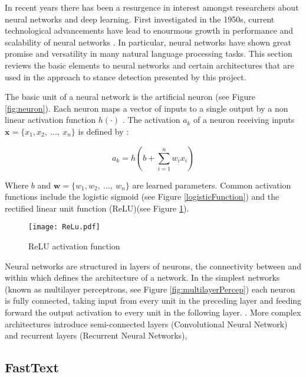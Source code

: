 \documentclass[Dissertation.tex]{subfiles}
\begin{document}
In recent years there has been a resurgence in interest amongst researchers about neural networks and deep learning. First investigated in the 1950s, current technological advancements have lead to enourmous growth in performance and scalability of neural networks \cite{pattersonDeepLearningPractitioner2017}. In particular, neural networks have shown great promise and versatility in many natural language processing tasks. This section reviews the basic elements to neural networks and certain architectures that are used in the approach to stance detection presented by this project. 

The basic unit of a neural network is the artificial neuron (see Figure \ref{fig:neuron}). Each neuron maps a vector of inputs to a single output by a non linear activation function $ h(\cdot) $ \cite{pattersonDeepLearningPractitioner2017}. The activation $ a_k $ of a neuron receiving inputs $ \mathbf{x} = \{x_1,x_2,\ \dots,\ x_n\} $ is defined by \cite{pattersonDeepLearningPractitioner2017}:

\[ a_k = h(b + \sum_{i=1}^n w_ix_i) \]

Where $ b $ and $ \mathbf{w} = \{w_1,w_2, \ \dots, \ w_n\} $ are learned parameters. Common activation functions include the logistic sigmoid (see Figure \ref{logisticFunction}) and the rectified linear unit function (ReLU)(see Figure \ref{fig:ReLU}).

\begin{figure}
	\centering
	\texttt{[image: ReLu.pdf]}
	
	\caption{ReLU activation function}
	\label{fig:ReLU}
	
\end{figure}

Neural networks are structured in layers of neurons, the connectivity between and within which defines the architecture of a network. In the simplest networks (known as multilayer perceptrons, see Figure \ref{fig:multilayerPercep}) each neuron is fully connected, taking input from every unit in the preceding layer and feeding forward the output activation to every unit in the following layer. \cite{pattersonDeepLearningPractitioner2017}. More complex architectures introduce semi-connected layers (Convolutional Neural Network) and recurrent layers (Recurrent Neural Networks)\cite{pattersonDeepLearningPractitioner2017},\cite{jurafskySpeechLanguageProcessing}


\subsection{FastText}
\end{document}

